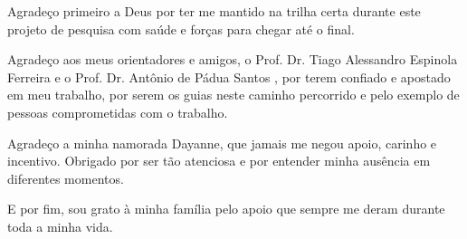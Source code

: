 Agradeço primeiro a Deus por ter me mantido na trilha certa durante este projeto de pesquisa com saúde e forças para chegar até o final.

Agradeço aos meus orientadores e amigos, o Prof. Dr. Tiago Alessandro Espinola Ferreira e o Prof. Dr. Antônio de Pádua Santos , por terem confiado e apostado em meu trabalho, por serem os guias neste caminho percorrido e pelo exemplo de pessoas comprometidas com o trabalho.

Agradeço a minha namorada Dayanne, que jamais me negou apoio, carinho e incentivo. Obrigado por ser tão atenciosa e por entender minha ausência em diferentes momentos.

E por fim, sou grato à minha família pelo apoio que sempre me deram durante toda a minha vida.